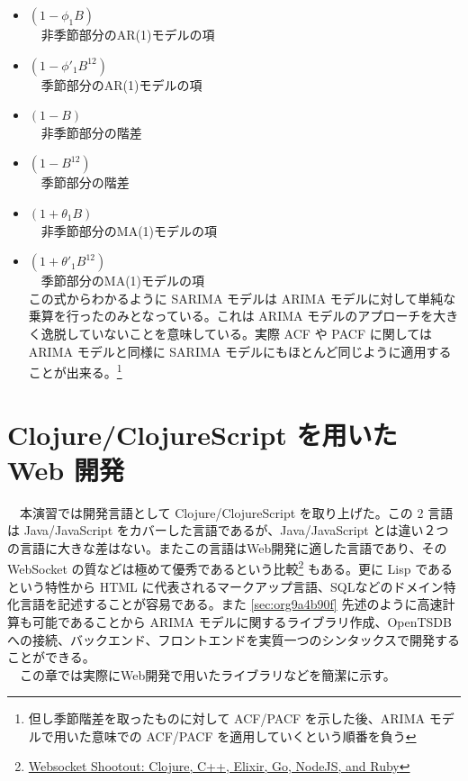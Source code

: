 \documentclass{scrartcl}
\begin{document}
\begin{itemize}
\item \((1-\phi_1 B)\) \\
　非季節部分のAR(1)モデルの項\\
\item \((1-\phi'_1B^{12})\)\\
　季節部分のAR(1)モデルの項\\
\item \((1-B)\)\\
　非季節部分の階差\\
\item \((1-B^{12})\)\\
　季節部分の階差\\
\item \((1+\theta_1B)\)\\
　非季節部分のMA(1)モデルの項\\
\item \((1+\theta'_1B^{12})\)\\
 　季節部分のMA(1)モデルの項\\
この式からわかるように SARIMA モデルは ARIMA モデルに対して単純な乗算を行ったのみとなっている。これは ARIMA モデルのアプローチを大きく逸脱していないことを意味している。実際 ACF や PACF に関しては ARIMA モデルと同様に SARIMA モデルにもほとんど同じように適用することが出来る。\footnote{但し季節階差を取ったものに対して ACF/PACF を示した後、ARIMA モデルで用いた意味での ACF/PACF を適用していくという順番を負う}\\
\end{itemize}
\section{Clojure/ClojureScript を用いた Web 開発}
\label{sec:org5743b5e}
　本演習では開発言語として Clojure/ClojureScript を取り上げた。この 2 言語は Java/JavaScript をカバーした言語であるが、Java/JavaScript とは違い２つの言語に大きな差はない。またこの言語はWeb開発に適した言語であり、その WebSocket の質などは極めて優秀であるという比較\footnote{\href{https://hashrocket.com/blog/posts/websocket-shootout}{Websocket Shootout: Clojure, C++, Elixir, Go, NodeJS, and Ruby}} もある。更に Lisp であるという特性から HTML に代表されるマークアップ言語、SQLなどのドメイン特化言語を記述することが容易である。また \ref{sec:org9a4b90f} 先述のように高速計算も可能であることから ARIMA モデルに関するライブラリ作成、OpenTSDBへの接続、バックエンド、フロントエンドを実質一つのシンタックスで開発することができる。\\
　この章では実際にWeb開発で用いたライブラリなどを簡潔に示す。\\
\end{document}
